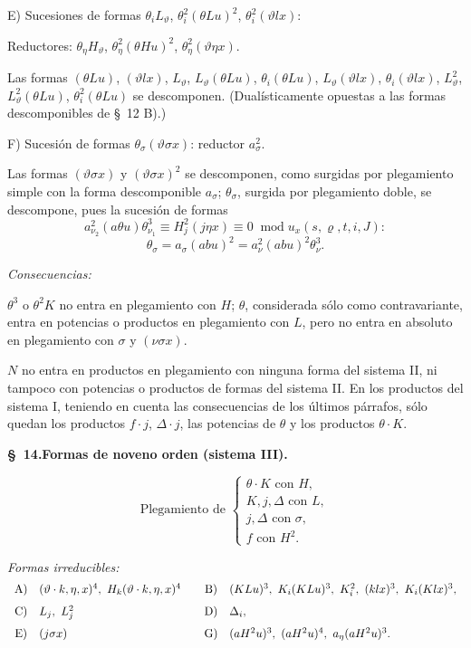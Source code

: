 \documentclass[11pt]{article}
\newcommand{\A}{\Delta}
\newcommand{\R}{\varrho}
\newcommand{\modu}[1]{\;\operatorname{mod} #1}
\begin{document}
\noindent E) Sucesiones de formas $\theta_iL_\vartheta$, $\theta_i^2(\theta Lu)^2$, $\theta_i^2(\vartheta lx)$:

Reductores: $\theta_\eta H_\vartheta$, $\theta_\eta^2(\theta Hu)^2$, $\theta_\eta^2(\vartheta\eta x)$.

Las formas $(\theta Lu)$, $(\vartheta lx)$, $L_\vartheta$, $L_\vartheta(\theta Lu)$, $\theta_i(\theta Lu)$, $L_\vartheta(\vartheta lx)$, $\theta_i(\vartheta lx)$, $L_\vartheta^2$, $L_\vartheta^2(\theta Lu)$, $\theta_i^2(\theta Lu)$ se descomponen. (Dualísticamente opuestas a las formas descomponibles de \S\ 12 B).)

\noindent F) Sucesión de formas $\theta_\sigma(\vartheta\sigma x)$: reductor $a_\sigma^2$.

Las formas $(\vartheta\sigma x)$ y $(\vartheta\sigma x)^2$ se descomponen, como surgidas por plegamiento simple con la forma descomponible $a_\sigma$; $\theta_\sigma$, surgida por plegamiento doble, se descompone, pues la sucesión de formas
\[
a_{\nu_2}^2(a\theta u)\theta_{\nu_1}^3\equiv H_j^2(j\eta x)\equiv0\modu{u_x(s,\R,t,i,J)}:
\]
\[
\theta_\sigma=a_\sigma(abu)^2=a_\nu^2(abu)^2\theta_\nu^3.
\]

\noindent\emph{Consecuencias:}

$\theta^3$ o $\theta^2K$ no entra en plegamiento con $H$; $\theta$, considerada sólo como contravariante, entra en potencias o productos en plegamiento con $L$, pero no entra en absoluto en plegamiento con $\sigma$ y $(\nu\sigma x)$.

$N$ no entra en productos en plegamiento con ninguna forma del sistema II, ni tampoco con potencias o productos de formas del sistema II. En los productos del sistema I, teniendo en cuenta las consecuencias de los últimos párrafos, sólo quedan los productos $f\cdot j$, $\A\cdot j$, las potencias de $\theta$ y los productos $\theta\cdot K$.

\begin{center}
\textbf{\S\ 14.\quad Formas de noveno orden (sistema III).}
\end{center}
\[
\text{Plegamiento de }\left\{\begin{array}{l}
\theta\cdot K\text{ con }H,\\
K,j,\A\text{ con }L,\\
j,\A\text{ con }\sigma,\\
f\text{ con }H^2.
\end{array}\right.
\]

\noindent\emph{Formas irreducibles:}
\[
\begin{array}{c@{\quad}l@{\qquad}c@{\quad}l}
\text{A)}&(\vartheta\cdot k,\eta,x)^4,
\ H_k(\vartheta\cdot k,\eta,x)^4&
\text{B)}&(KLu)^3,
\ K_i(KLu)^3,
\ K_i^2,
\ (klx)^3,
\ K_i(Klx)^3,\\[0.7em]
\text{C)}&L_j,
\ L_j^2&
\text{D)}&\A_i,\\[0.7em]
\text{E)}&(j\sigma x)&
\text{G)}&(aH^2u)^3,
\ (aH^2u)^4,
\ a_\eta(aH^2u)^3.
\end{array}
\]
\end{document}
